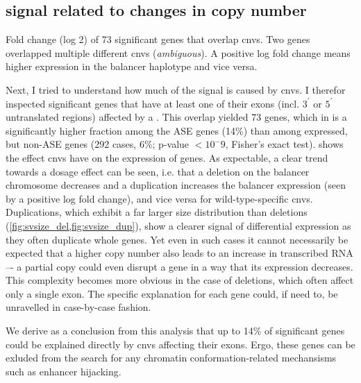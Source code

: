 \subsection{\texorpdfstring{\ase}{ASE} signal related to changes in copy number}
\label{sec:balancer_ase_cnvs}

%
%
    {Fold change (log 2) of 73 significant \ase genes that overlap \acp{cnv}.
    Two genes overlapped multiple different \acp{cnv} (\textit{ambiguous}). A
    positive log fold change means higher expression in the balancer haplotype
    and vice versa.}

Next, I tried to understand how much of the \ase signal is caused by \acp{cnv}.
I therefor inspected significant \ase genes that have at least one of their
exons (incl. $3^\prime$ or $5^\prime$ untranslated regions) affected by a \cnv.
This overlap yielded 73 genes, which in is a significantly higher fraction
among the ASE genes (14\%) than among expressed, but non-ASE genes (292 cases,
6\%; p-value $<10^-9$, Fisher's exact test).  shows
the effect \acp{cnv} have on the expression of \ase genes. As expectable, a
clear trend towards a dosage effect can be seen, i.e. that a deletion on the
balancer chromosome decreases and a duplication increases the balancer
expression (seen by a positive log fold change), and vice versa for
wild-type-specific \acp{cnv}. Duplications, which exhibit a far larger size
distribution than deletions (\cref{fig:svsize_del,fig:svsize_dup}), show a
clearer signal of differential expression as they often duplicate whole genes.
Yet even in such cases it cannot necessarily be expected that a higher copy
number also leads to an increase in transcribed RNA –- a partial copy could
even disrupt a gene in a way that its expression decreases. This complexity
becomes more obvious in the case of deletions, which often affect only a single
exon. The specific explanation for each gene could, if need to, be unravelled
in case-by-case fashion.

We derive as a conclusion from this analysis that up to 14\% of significant \ase
genes could be explained directly by \acp{cnv} affecting their exons.
Ergo, these genes can be exluded from the search for any chromatin
conformation-related mechansisms such as enhancer hijacking.





